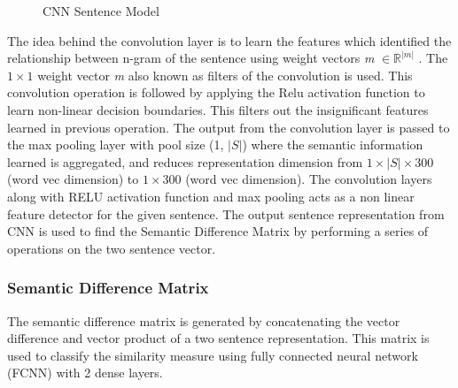 \documentclass[12pt]{report} %
\begin{document}
		\begin{figure}[hbp]
			\centering
			\label{CNN_1}
			\caption{CNN Sentence Model \cite{severyn2015learning}}
		\end{figure}
		
	
	The idea behind the convolution layer is to learn the features which identified the relationship between n-gram of the sentence using weight vectors \textit{m} $\in \mathbb{R}^{|m|}$ . The $1 \times 1$ weight vector \textit{m} also known as filters of the convolution is used. This convolution operation is followed by applying the Relu activation function to learn non-linear decision boundaries. This filters out the insignificant features learned in previous operation. The output from the convolution layer is passed to the max pooling layer with pool size (1, $|S|$) where the semantic information learned is aggregated, and reduces representation dimension from $1 \times |S| \times 300$ (word vec dimension) to $1 \times 300$ (word vec dimension). The convolution layers along with RELU activation function and max pooling acts as a non linear  feature detector for the given sentence. The output sentence representation from CNN is used to find the Semantic Difference Matrix by performing a series of operations on the two sentence vector. 
		
	
	\subsubsection*{Semantic Difference Matrix}
	The semantic difference matrix is generated by concatenating the vector difference and vector product of a two sentence representation. This matrix is used to classify the similarity measure using fully connected neural network (FCNN) with 2 dense layers. 
	
\end{document}
